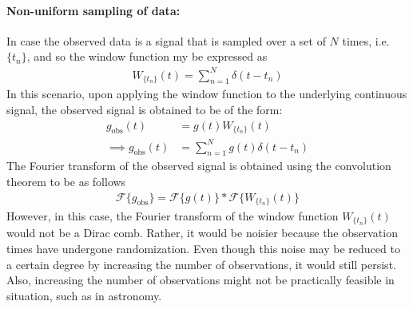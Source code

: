    			\paragraph{Non-uniform sampling of data:}
    			In case the observed data is a signal that is sampled over a set of $N$ times, i.e. $\{t_n\}$, and so the window function my be expressed as
    			\begin{align}
    				W_{\{t_n\}}(t)=\sum_{n=1}^{N}{\delta(t-t_n)} \label{eqn:nonunif-dirac-comb}
    			\end{align}
    			In this scenario, upon applying the window function to the underlying continuous signal, the observed signal is obtained to be of the form:
    			\begin{align}
    				g_\text{obs}(t)&=g(t)W_{\{t_n\}}(t) \nonumber \\
    				\implies g_\text{obs}(t)&=\sum_{n=1}^{N}{g(t)\delta(t-t_n)} \label{eqn:obs-func-nonunif}
    			\end{align}
    			The Fourier transform of the observed signal is obtained using the convolution theorem to be as follows
    			\begin{align}
    				\mathscr{F}\{g_\text{obs}\}=\mathscr{F}\{g(t)\}*\mathscr{F}\{W_{\{t_n\}}(t)\} \label{eqn:FT-obs-func-nonunif}
    			\end{align}
    			However, in this case, the Fourier transform of the window function $W_{\{t_n\}}(t)$ would not be a Dirac comb. Rather, it would be noisier because the observation times have undergone randomization. Even though this noise may be reduced to a certain degree by increasing the number of observations, it would still persist. Also, increasing the number of observations might not be practically feasible in situation, such as in astronomy.
    				
